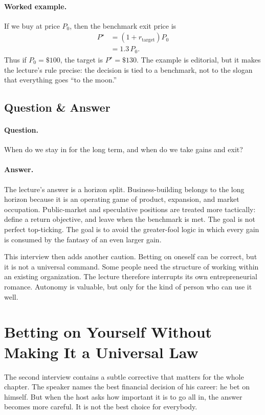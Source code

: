 \paragraph{Worked example.} If we buy at price \(P_0\), then the benchmark exit price is
\begin{align}
P^\star &= (1+r_{\text{target}})P_0 \\
&= 1.3\,P_0.
\end{align}
Thus if \(P_0=\$100\), the target is \(P^\star=\$130\). The example is editorial, but it makes the lecture's rule precise: the decision is tied to a benchmark, not to the slogan that everything goes ``to the moon.''

\subsection{Question \& Answer}

\paragraph{Question.} When do we stay in for the long term, and when do we take gains and exit?

\paragraph{Answer.} The lecture's answer is a horizon split. Business-building belongs to the long horizon because it is an operating game of product, expansion, and market occupation. Public-market and speculative positions are treated more tactically: define a return objective, and leave when the benchmark is met. The goal is not perfect top-ticking. The goal is to avoid the greater-fool logic in which every gain is consumed by the fantasy of an even larger gain.

This interview then adds another caution. Betting on oneself can be correct, but it is not a universal command. Some people need the structure of working within an existing organization. The lecture therefore interrupts its own entrepreneurial romance. Autonomy is valuable, but only for the kind of person who can use it well.

\section{Betting on Yourself Without Making It a Universal Law}

The second interview contains a subtle corrective that matters for the whole chapter. The speaker names the best financial decision of his career: he bet on himself. But when the host asks how important it is to go all in, the answer becomes more careful. It is not the best choice for everybody.

